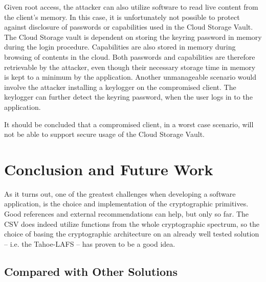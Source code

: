\documentclass[pdftex,english,10pt,b5paper,twoside]{book}
\begin{document}
Given root access, the attacker can also utilize software to read live content
from the client's memory. In this case, it is unfortunately not possible to protect against
disclosure of passwords or capabilities used in the Cloud Storage Vault. The
Cloud Storage vault is dependent on storing the keyring password in memory
during the login procedure. Capabilities are also stored in memory during
browsing of contents in the cloud. Both passwords and capabilities are therefore
retrievable by the attacker, even though their necessary storage time in memory is kept to a
minimum by the application. Another unmanageable scenario would involve the
attacker installing a keylogger on the compromised client. The keylogger can
further detect the keyring password, when the user logs in to the application.

It should be concluded that a compromised client, in a worst case scenario, will not be able
to support secure usage of the Cloud Storage Vault.





\chapter{Conclusion and Future Work}
\label{ch:conclusion}

As it turns out, one of the greatest challenges when developing a software
application, is the choice and implementation of the cryptographic primitives.
Good references and external recommendations can help, but only so far.
The \ac{CSV} does indeed utilize functions from the whole cryptographic
spectrum, so the choice of basing the cryptographic architecture on an already
well tested solution -- i.e. the Tahoe-\ac{LAFS} -- has proven to be a good
idea.

\section{Compared with Other Solutions}


\end{document}
